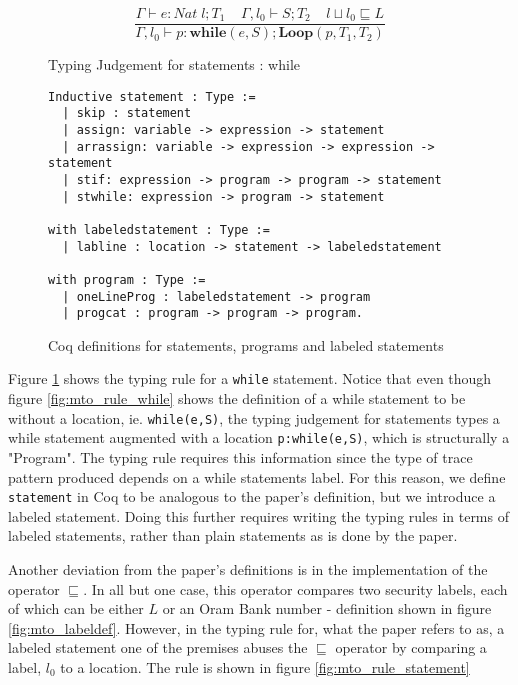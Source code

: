 \documentclass[10pt,  onecolumn]{article}
\begin{document}
\begin{figure}
\caption{ Typing Judgement for statements : while}
\label{fig:while_judgement}
\[
\frac{ \Gamma \vdash e : Nat \; l; T_{1}   \;\;\;\;  \Gamma, l_{0} \vdash S;T_{2}  \;\;\;\;   l \sqcup l_{0} \sqsubseteq L }
	{ \Gamma, l_{0} \vdash p:\textbf{while}(e,S);\textbf{Loop}(p,T_{1},T_{2}) }
\]
\end{figure}

\begin{figure}
\caption{Coq definitions for statements, programs and labeled statements}
\label{fig:coq_statements}
\begin{lstlisting}
Inductive statement : Type :=
  | skip : statement
  | assign: variable -> expression -> statement
  | arrassign: variable -> expression -> expression -> statement
  | stif: expression -> program -> program -> statement
  | stwhile: expression -> program -> statement

with labeledstatement : Type :=
  | labline : location -> statement -> labeledstatement

with program : Type :=
  | oneLineProg : labeledstatement -> program
  | progcat : program -> program -> program.
\end{lstlisting}
\end{figure}



Figure \ref{fig:while_judgement} shows the typing rule for a \texttt{while} statement.
Notice that even though figure \ref{fig:mto_rule_while} shows the definition of a while statement to be without a location, ie. \texttt{while(e,S)}, the typing judgement for statements types a while statement augmented with a location \texttt{p:while(e,S)}, which is structurally a "Program".
The typing rule requires this information since the type of trace pattern produced depends on a while statements label.
For this reason, we define \texttt{statement} in Coq to be analogous to the paper's definition, but we introduce a labeled statement.
Doing this further requires writing the typing rules in terms of labeled statements, rather than plain statements as is done by the paper.

Another deviation from the paper's definitions is in the implementation of the operator $\sqsubseteq$.
In all but one case, this operator compares two security labels, each of which can be either $L$ or an Oram Bank number - definition shown in figure \ref{fig:mto_labeldef}.
However, in the typing rule for, what the paper refers to as, a labeled statement one of the premises abuses the $\sqsubseteq$ operator by comparing a label, $l_{0}$ to a location. The rule is shown in figure \ref{fig:mto_rule_statement}
\end{document}
